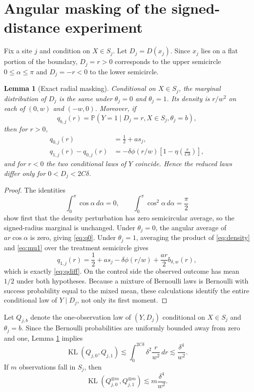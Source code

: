 \documentclass[11pt]{article}
\newtheorem{lemma}{Lemma}
\newcommand{\Pp}{\mathbb P}
\newcommand{\KL}{\operatorname{KL}}
\newcommand{\1}{\mathbf 1}
\begin{document}
\section{Angular masking of the signed-distance experiment}

Fix a site $j$ and condition on $X\in S_j$.  Let $D_j=D(x_j)$.  Since $x_j$ lies on a flat portion of the boundary, $D_j=r>0$ corresponds to the upper semicircle $0\le\alpha\le\pi$ and $D_j=-r<0$ to the lower semicircle.

\begin{lemma}[Exact radial masking]
\label{lem:mask}
Conditional on $X\in S_j$, the marginal distribution of $D_j$ is the same under $\theta_j=0$ and $\theta_j=1$.  Its density is $r/w^2$ on each of $(0,w)$ and $(-w,0)$.  Moreover, if
\[
q_{b,j}(r)=\Pp(Y=1\mid D_j=r,X\in S_j,\theta_j=b),
\]
then for $r>0$,
\begin{align}
q_{0,j}(r)&=\frac12+a s_j,                                    \label{eq:q0}\\
q_{1,j}(r)-q_{0,j}(r)
&=-\delta\phi(r/w)
\left[1-\eta\!\left(\frac{r}{C\delta}\right)\right],        \label{eq:qdiff}
\end{align}
and for $r<0$ the two conditional laws of $Y$ coincide.  Hence the reduced laws differ only for $0<D_j<2C\delta$.
\end{lemma}

\begin{proof}
The identities
\[
\int_0^\pi\cos\alpha\,d\alpha=0,
\qquad
\int_0^\pi\cos^2\alpha\,d\alpha=\frac\pi2
\]
show first that the density perturbation has zero semicircular average, so the signed-radius marginal is unchanged.  Under $\theta_j=0$, the angular average of $a r\cos\alpha$ is zero, giving \eqref{eq:q0}.  Under $\theta_j=1$, averaging the product of \eqref{eq:density} and \eqref{eq:mu1} over the treatment semicircle gives
\[
q_{1,j}(r)
=\frac12+a s_j-\delta\phi(r/w)+\frac{a r}{2}b_{\delta,w}(r),
\]
which is exactly \eqref{eq:qdiff}.  On the control side the observed outcome has mean $1/2$ under both hypotheses.  Because a mixture of Bernoulli laws is Bernoulli with success probability equal to the mixed mean, these calculations identify the entire conditional law of $Y\mid D_j$, not only its first moment.
\end{proof}

Let $Q_{j,b}$ denote the one-observation law of $(Y,D_j)$ conditional on $X\in S_j$ and $\theta_j=b$.  Since the Bernoulli probabilities are uniformly bounded away from zero and one, Lemma \ref{lem:mask} implies
\begin{equation}
\KL(Q_{j,0},Q_{j,1})
\lesssim
\int_0^{2C\delta}\delta^2\frac{r}{w^2}\,dr
\lesssim \frac{\delta^4}{w^2}.                              \label{eq:localkl}
\end{equation}
If $m$ observations fall in $S_j$, then
\begin{equation}
\KL(Q_{j,0}^{\otimes m},Q_{j,1}^{\otimes m})
\lesssim m\frac{\delta^4}{w^2}.                             \label{eq:mkl}
\end{equation}
\end{document}
